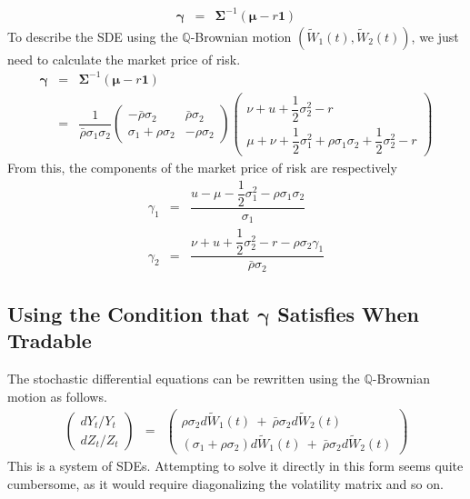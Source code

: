 \documentclass[uplatex,a4j,12pt,dvipdfmx]{jsarticle}
\begin{document}
%
%
\begin{eqnarray}
	{\bm \gamma}
	&=&
	{\bm \Sigma}^{-1}
	( {\bm \mu} - r {\bm 1} )
\end{eqnarray}
%
%
To describe the SDE using the $\mathbb{Q}$-Brownian motion
$(\tilde{W}_{1}(t),\tilde{W}_{2}(t))$,
we just need to calculate the market price of risk.
%
%
\begin{eqnarray}
	{\bm \gamma}
	&=&
	{\bm \Sigma}^{-1}
	( {\bm \mu} - r {\bm 1} )
	\\ &=&
	\dfrac{1}{ \bar{\rho} \sigma_{1} \sigma_{2} }
	\left(
	\!\!
	\begin{array}{cc}
			- \bar{\rho} \sigma_{2}      & \bar{\rho} \sigma_{2}
			\\
			\sigma_{1} + \rho \sigma_{2} & - \rho \sigma_{2}
		\end{array}
	\!\!
	\right)
	\!\!
	\left(
	\begin{array}{c}
			\nu + u + \dfrac{1}{2} \sigma_{2}^{2} - r
			\\
			\mu + \nu + \dfrac{1}{2} \sigma_{1}^{2} + \rho \sigma_{1} \sigma_{2} + \dfrac{1}{2} \sigma_{2}^{2} - r
		\end{array}
	\right)
\end{eqnarray}
%
%
From this, the components of the market price of risk are respectively
%
%
\begin{eqnarray}
	\gamma_{1}
	&=&
	\dfrac{
		u
		-
		\mu - \dfrac{1}{2} \sigma_{1}^{2} - \rho \sigma_{1} \sigma_{2}
	}
	{ \sigma_{1} }
	\\[3mm]
	\gamma_{2}
	&=&
	\dfrac{
		\nu + u + \dfrac{1}{2} \sigma_{2}^{2} - r - \rho \sigma_{2} \gamma_{1}
	}
	{ \bar{\rho} \sigma_{2} }
\end{eqnarray}
%
%

\subsection*{Using the Condition that $\bm{\gamma}$ Satisfies When Tradable}
The stochastic differential equations can be rewritten using the $\mathbb{Q}$-Brownian motion as follows.
%
%
\begin{eqnarray}
	\left(
	\begin{array}{c}
		d Y_{t} / Y_{t}
		\\
		d Z_{t} / Z_{t}
	\end{array}
	\right)
	&=&
	\left(
	\begin{array}{l}
		\rho \sigma_{2} d \tilde{W}_{1}(t) \ + \ \bar{\rho} \sigma_{2} d \tilde{W}_{2}(t)
		\\
		( \sigma_{1} + \rho \sigma_{2} ) d \tilde{W}_{1}(t) \ + \ \bar{\rho} \sigma_{2} d \tilde{W}_{2}(t)
	\end{array}
	\right)
\end{eqnarray}
%
%
This is a system of SDEs. Attempting to solve it directly in this form seems quite cumbersome, as it would require diagonalizing the volatility matrix and so on.
\end{document}
